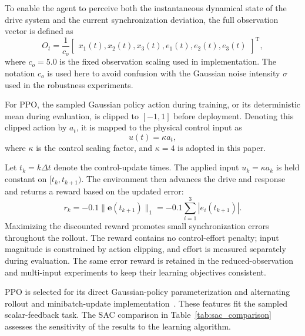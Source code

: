 \documentclass[a4paper,fleqn]{cas-dc}
\theoremstyle{plain}
\theoremstyle{definition}
\begin{document}

To enable the agent to perceive both the instantaneous dynamical state of the drive system and the current synchronization deviation, the full observation vector is defined as
\begin{equation}
	O_t
	=
	\frac{1}{c_o}
	\begin{bmatrix}
		x_1(t),x_2(t),x_3(t),
		e_1(t),e_2(t),e_3(t)
	\end{bmatrix}^{\mathrm T},
	\label{eq:observation_space}
\end{equation}
where $c_o=5.0$ is the fixed observation scaling used in implementation. The notation $c_o$ is used here to avoid confusion with the Gaussian noise intensity $\sigma$ used in the robustness experiments.

For PPO, the sampled Gaussian policy action during training, or its deterministic mean during evaluation, is clipped to $[-1,1]$ before deployment. Denoting this clipped action by $a_t$, it is mapped to the physical control input as
\begin{equation}
	u(t)=\kappa a_t,
	\label{eq:action_mapping}
\end{equation}
where $\kappa$ is the control scaling factor, and $\kappa=4$ is adopted in this paper.

Let $t_k=k\Delta t$ denote the control-update times. The applied input $u_k=\kappa a_k$ is held constant on $[t_k,t_{k+1})$. The environment then advances the drive and response and returns a reward based on the updated error:
\begin{equation}
	r_k
	=
	-0.1\|\mathbf{e}(t_{k+1})\|_1
	=
	-0.1\sum_{i=1}^{3}|e_i(t_{k+1})|.
	\label{eq:reward_function}
\end{equation}
Maximizing the discounted reward promotes small synchronization errors throughout the rollout. The reward contains no control-effort penalty; input magnitude is constrained by action clipping, and effort is measured separately during evaluation. The same error reward is retained in the reduced-observation and multi-input experiments to keep their learning objectives consistent.

PPO is selected for its direct Gaussian-policy parameterization and alternating rollout and minibatch-update implementation~\cite{schulman2017proximal}. These features fit the sampled scalar-feedback task. The SAC comparison in Table~\ref{tab:sac_comparison} assesses the sensitivity of the results to the learning algorithm.
\end{document}
